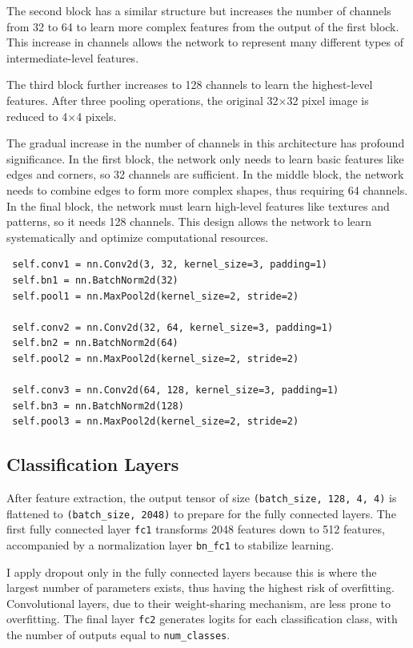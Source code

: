 \documentclass[12pt, a4paper, openany]{report}
\begin{document}
 The second block has a similar structure but increases the number of channels from 32 to 64 to learn more complex features from the output of the first block. This increase in channels allows the network to represent many different types of intermediate-level features.

 The third block further increases to 128 channels to learn the highest-level features. After three pooling operations, the original 32×32 pixel image is reduced to 4×4 pixels.

 The gradual increase in the number of channels in this architecture has profound significance. In the first block, the network only needs to learn basic features like edges and corners, so 32 channels are sufficient. In the middle block, the network needs to combine edges to form more complex shapes, thus requiring 64 channels. In the final block, the network must learn high-level features like textures and patterns, so it needs 128 channels. This design allows the network to learn systematically and optimize computational resources.

 \begin{verbatim}
 self.conv1 = nn.Conv2d(3, 32, kernel_size=3, padding=1)
 self.bn1 = nn.BatchNorm2d(32)
 self.pool1 = nn.MaxPool2d(kernel_size=2, stride=2)

 self.conv2 = nn.Conv2d(32, 64, kernel_size=3, padding=1)
 self.bn2 = nn.BatchNorm2d(64)
 self.pool2 = nn.MaxPool2d(kernel_size=2, stride=2)

 self.conv3 = nn.Conv2d(64, 128, kernel_size=3, padding=1)
 self.bn3 = nn.BatchNorm2d(128)
 self.pool3 = nn.MaxPool2d(kernel_size=2, stride=2)
 \end{verbatim}

 \subsection{Classification Layers} %
 After feature extraction, the output tensor of size \texttt{(batch\_size, 128, 4, 4)} is flattened to \texttt{(batch\_size, 2048)} to prepare for the fully connected layers. The first fully connected layer \texttt{fc1} transforms 2048 features down to 512 features, accompanied by a normalization layer \texttt{bn\_fc1} to stabilize learning.

 I apply dropout only in the fully connected layers because this is where the largest number of parameters exists, thus having the highest risk of overfitting. Convolutional layers, due to their weight-sharing mechanism, are less prone to overfitting. The final layer \texttt{fc2} generates logits for each classification class, with the number of outputs equal to \texttt{num\_classes}.
\end{document}
